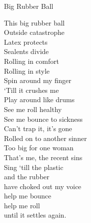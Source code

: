 Big Rubber Ball

This big rubber ball\\
Outside catastrophe\\
Latex protects\\
Sealents divide\\
Rolling in comfort\\
Rolling in style\\
Spin around my finger\\
`Till it crushes me\\
Play around like drums\\
See me roll healthy\\
See me bounce to sickness\\
Can't trap it, it's gone\\
Rolled on to another sinner\\
Too big for one woman\\
That's me, the recent sins\\
Sing `till the plastic\\
and the rubber\\
have choked out my voice\\
help me bounce\\
help me roll\\
until it settles again.\\

